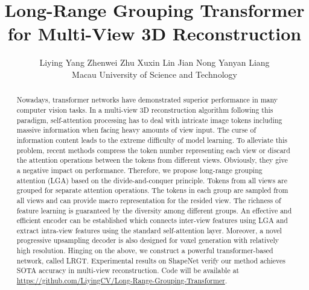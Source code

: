 \documentclass[10pt,twocolumn,letterpaper]{article}
\begin{document}
\title{Long-Range Grouping Transformer for Multi-View 3D Reconstruction}

\author{Liying Yang\hspace{0.05in}
Zhenwei Zhu\hspace{0.05in}
Xuxin Lin\hspace{0.05in}
Jian Nong\hspace{0.05in}
Yanyan Liang\\
Macau University of Science and Technology\hspace{0.1in} \\
}
\maketitle


\renewcommand{\thefootnote}{\fnsymbol{footnote}}

\begin{abstract}
Nowadays, transformer networks have demonstrated superior performance in many computer vision tasks. In a multi-view 3D reconstruction algorithm following this paradigm, self-attention processing has to deal with intricate image tokens including massive information when facing heavy amounts of view input. The curse of information content leads to the extreme difficulty of model learning. To alleviate this problem, recent methods compress the token number representing each view or discard the attention operations between the tokens from different views. Obviously, they give a negative impact on performance. Therefore, we propose long-range grouping attention (LGA) based on the divide-and-conquer principle. Tokens from all views are grouped for separate attention operations. The tokens in each group are sampled from all views and can provide macro representation for the resided view. The richness of feature learning is guaranteed by the diversity among different groups. An effective and efficient encoder can be established which connects inter-view features using LGA and extract intra-view features using the standard self-attention layer. Moreover, a novel progressive upsampling decoder is also designed for voxel generation with relatively high resolution. Hinging on the above, we construct a powerful transformer-based network, called LRGT. Experimental results on ShapeNet verify our method achieves SOTA accuracy in multi-view reconstruction. Code will be available at \url{https://github.com/LiyingCV/Long-Range-Grouping-Transformer}.
\end{abstract}
\end{document}
